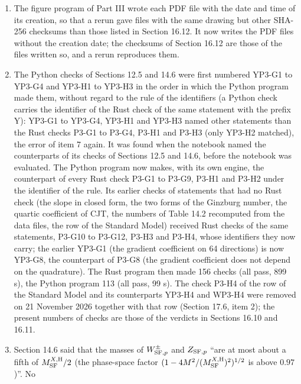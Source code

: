 \documentclass[
  10pt,
]{article}
\begin{document}
\begin{enumerate}
  first draft of this item and of Section 16.9 said ``about sixteen
  minutes with Section 12.5'': that was an estimate written before the
  program was run, and it was false (the new modules add about a
  second); it was corrected before the commit.
\item
  The figure program of Part III wrote each PDF file with the date and
  time of its creation, so that a rerun gave files with the same drawing
  but other SHA-256 checksums than those listed in Section 16.12. It now
  writes the PDF files without the creation date; the checksums of
  Section 16.12 are those of the files written so, and a rerun
  reproduces them.
\item
  The Python checks of Sections 12.5 and 14.6 were first numbered YP3-G1
  to YP3-G4 and YP3-H1 to YP3-H3 in the order in which the Python
  program made them, without regard to the rule of the identifiers (a
  Python check carries the identifier of the Rust check of the same
  statement with the prefix Y): YP3-G1 to YP3-G4, YP3-H1 and YP3-H3
  named other statements than the Rust checks P3-G1 to P3-G4, P3-H1 and
  P3-H3 (only YP3-H2 matched), the error of item 7 again. It was found
  when the notebook named the counterparts of its checks of Sections
  12.5 and 14.6, before the notebook was evaluated. The Python program
  now makes, with its own engine, the counterpart of every Rust check
  P3-G1 to P3-G9, P3-H1 and P3-H2 under the identifier of the rule. Its
  earlier checks of statements that had no Rust check (the slope in
  closed form, the two forms of the Ginzburg number, the quartic
  coefficient of CJT, the numbers of Table 14.2 recomputed from the data
  files, the row of the Standard Model) received Rust checks of the same
  statements, P3-G10 to P3-G12, P3-H3 and P3-H4, whose identifiers they
  now carry; the earlier YP3-G1 (the gradient coefficient on 64
  directions) is now YP3-G8, the counterpart of P3-G8 (the gradient
  coefficient does not depend on the quadrature). The Rust program then
  made 156 checks (all pass, 899 s), the Python program 113 (all pass,
  99 s). The check P3-H4 of the row of the Standard Model and its
  counterparts YP3-H4 and WP3-H4 were removed on 21 November 2026
  together with that row (Section 17.6, item 2); the present numbers of
  checks are those of the verdicts in Sections 16.10 and 16.11.
\item
  Section 14.6 said that the masses of \(W^\pm_{{\rm SF},p}\) and
  \(Z_{{\rm SF},p}\) ``are at most about a fifth of
  \(M^{X,{\rm H}}_{\rm SF}/2\) (the phase-space factor
  \((1-4M^2/(M^{X,{\rm H}}_{\rm SF})^2)^{1/2}\) is above \(0.97\))''. No

\end{enumerate}
\end{document}
